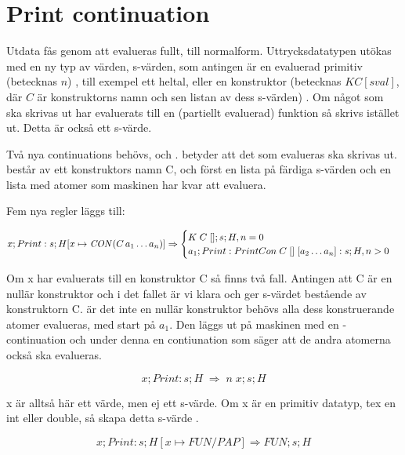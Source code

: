 \documentclass[../Appendix]{subfiles}
\begin{document}
\chapter{Print continuation}
\label{sec:printcont}
Utdata fås genom att  evalueras fullt, till normalform. 
Uttrycksdatatypen utökas med en ny typ av värden, 
s-värden, som antingen är en evaluerad primitiv (betecknas $n$)
, till exempel ett heltal, eller en konstruktor (betecknas $K C [sval]$, där
$C$ är konstruktorns namn och sen listan av dess s-värden) .
Om något som ska skrivas ut har evaluerats till en (partiellt evaluerad)
funktion så skrivs  istället ut. Detta är också ett s-värde.





Två nya continuations behövs,  och .
 betyder att det som evalueras ska skrivas ut.  består av ett
konstruktors namn C, och först en lista på färdiga s-värden och en lista med
atomer som maskinen har kvar att evaluera.

Fem nya regler läggs till:

\[
x ; Print : s ; H[x \mapsto \text{\emph{CON}}(C\,a_1 \ldots a_n)]
\Rightarrow \begin{cases} 
K \; C \; [] ; s ; H , n = 0 \\
a_1 ; Print : PrintCon \; C \; [] \; [a_2 \ldots a_n] : s ; H , n > 0
\end{cases}
\]

Om x har evaluerats till en konstruktor C så finns två fall. Antingen att C är
en nullär konstruktor och i det fallet är vi klara och ger s-värdet bestående
av konstruktorn C.
    är det inte en nullär konstruktor behövs alla dess konstruerande atomer
evalueras, med start på $a_1$. Den läggs ut på maskinen med en -continuation
och under denna en contiunation som säger att de andra atomerna också ska
evalueras.
 

\[
x ; Print : s ; H \; \Rightarrow \; n \; x ; s ; H
\]

x är alltså här ett värde, men ej ett s-värde.
Om x är en primitiv datatyp, tex en int eller double, så skapa detta s-värde
.


\[
x ; Print : s ; H[x \mapsto FUN / PAP] \Rightarrow FUN ; s ; H
\]
\end{document}
